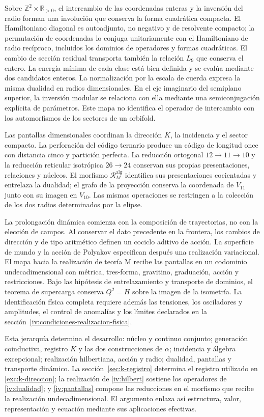 Sobre \(\mathbb Z^2\times\mathbb R_{>0}\), el intercambio de las
coordenadas enteras y la inversión del radio forman una involución
que conserva la forma cuadrática compacta. El Hamiltoniano diagonal es
autoadjunto, no negativo y de resolvente compacto; la permutación de
coordenadas lo conjuga unitariamente con el Hamiltoniano de radio
recíproco, incluidos los dominios de operadores y formas cuadráticas.
El cambio de sección residual transporta también la relación \(L_9\)
que conserva el entero. La energía mínima de cada clase está bien
definida y se evalúa mediante dos candidatos enteros. La normalización
por la escala de cuerda expresa la misma dualidad en radios
dimensionales. En el eje imaginario del semiplano superior, la inversión
modular se relaciona con ella mediante una semiconjugación explícita
de parámetros. Este mapa no identifica el operador de intercambio con
los automorfismos de los sectores de un orbifold.

Las pantallas dimensionales coordinan la dirección \(K\), la incidencia
y el sector compacto. La perforación del código ternario produce un
código de longitud once con distancia cinco y partición perfecta.
La reducción ortogonal \(12\to11\to10\) y la reducción reticular
isotrópica \(26\to24\) conservan sus propias presentaciones, relaciones
y núcleos. El morfismo \(\mathcal R_M^{\mathrm{alg}}\) identifica sus
presentaciones cocientadas y entrelaza la dualidad; el grafo de la
proyección conserva la coordenada de \(V_{11}\) junto con su imagen
en \(V_{10}\). Las mismas operaciones se restringen a la colección de
los dos radios determinados por la elipse.

La prolongación dinámica comienza con la composición de trayectorias,
no con la elección de campos. Al conservar el dato precedente en la
frontera, los cambios de dirección y de tipo aritmético definen un
cociclo aditivo de acción. La superficie de mundo y la acción de
Polyakov especifican después una realización variacional. El mapa
hacia la realización de teoría M recibe las pantallas en un codominio
undecadimensional con métrica, tres-forma, gravitino, graduación,
acción y restricciones. Bajo las hipótesis de entrelazamiento y
transporte de dominios, el teorema de supercarga conserva \(Q^2=H\)
sobre la imagen de la isometría. La identificación física completa
requiere además las tensiones, los osciladores y amplitudes, el control
de anomalías y los límites declarados en la
sección~\ref{iv:condiciones-realizacion-fisica}.

Esta jerarquía determina el desarrollo: núcleo y continuo conjunto;
generación coinductiva, registro \(K\) y las dos construcciones de
\(\alpha\); incidencia y álgebra excepcional; realización hilbertiana,
acción y radio; dualidad, pantallas y transporte dinámico.
La sección~\ref{sec:k-registro} determina el registro utilizado en
\ref{exc:k-direccion}; la realización de \ref{iv:hilbert} sostiene
los operadores de \ref{iv:dualidad}; y
\ref{iv:pantallas} compone las reducciones en el morfismo que recibe la
realización undecadimensional. El argumento enlaza así estructura,
valor, representación y ecuación mediante sus aplicaciones efectivas.

\par\endgroup
